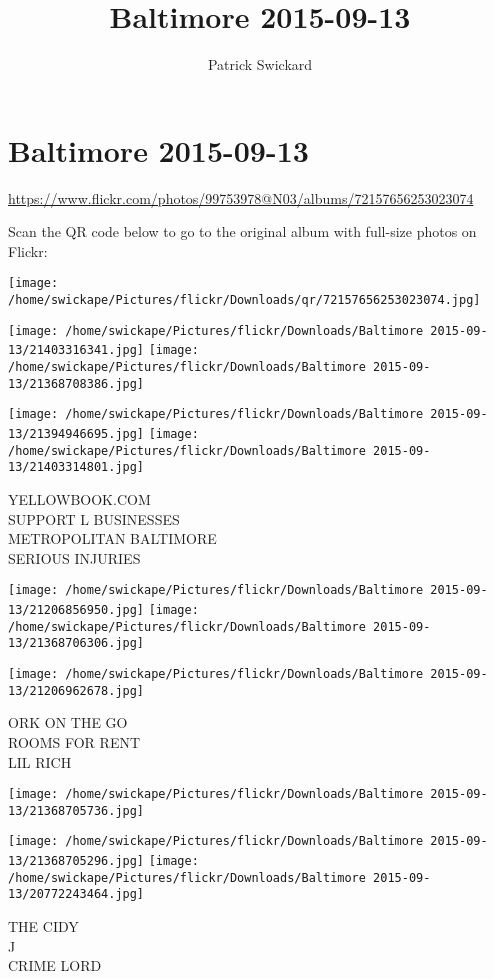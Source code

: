 \documentclass[10pt,letterpaper]{article}
\title{Baltimore 2015-09-13}
\author{Patrick Swickard}
\date{}
\begin{document}
\section*{Baltimore 2015-09-13}

\url{https://www.flickr.com/photos/99753978@N03/albums/72157656253023074}

Scan the QR code below to go to the original album with full-size photos on Flickr:

\texttt{[image: /home/swickape/Pictures/flickr/Downloads/qr/72157656253023074.jpg]}
\pagebreak

\texttt{[image: /home/swickape/Pictures/flickr/Downloads/Baltimore 2015-09-13/21403316341.jpg]}
\texttt{[image: /home/swickape/Pictures/flickr/Downloads/Baltimore 2015-09-13/21368708386.jpg]}

\texttt{[image: /home/swickape/Pictures/flickr/Downloads/Baltimore 2015-09-13/21394946695.jpg]}
\texttt{[image: /home/swickape/Pictures/flickr/Downloads/Baltimore 2015-09-13/21403314801.jpg]}

YELLOWBOOK.COM\\
SUPPORT L BUSINESSES\\
METROPOLITAN BALTIMORE\\
SERIOUS INJURIES
\pagebreak

\texttt{[image: /home/swickape/Pictures/flickr/Downloads/Baltimore 2015-09-13/21206856950.jpg]}
\texttt{[image: /home/swickape/Pictures/flickr/Downloads/Baltimore 2015-09-13/21368706306.jpg]}

\vspace{0.25in}
\texttt{[image: /home/swickape/Pictures/flickr/Downloads/Baltimore 2015-09-13/21206962678.jpg]}

ORK ON THE GO\\
ROOMS FOR RENT\\
LIL RICH
\pagebreak

\texttt{[image: /home/swickape/Pictures/flickr/Downloads/Baltimore 2015-09-13/21368705736.jpg]}

\vspace{0.25in}
\texttt{[image: /home/swickape/Pictures/flickr/Downloads/Baltimore 2015-09-13/21368705296.jpg]}
\texttt{[image: /home/swickape/Pictures/flickr/Downloads/Baltimore 2015-09-13/20772243464.jpg]}

THE CIDY\\
J\\
CRIME LORD
\pagebreak
\end{document}

